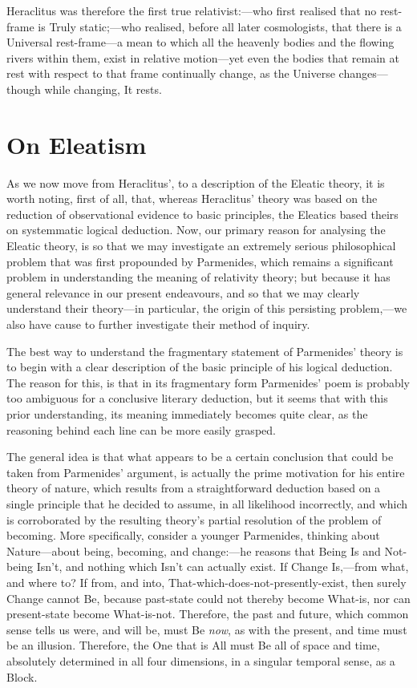 Heraclitus was therefore the first true relativist:---who first realised that no rest-frame is Truly static;---who realised, before all later cosmologists, that there is a Universal rest-frame---a mean to which all the heavenly bodies and the flowing rivers within them, exist in relative motion---yet even the bodies that remain at rest with respect to that frame continually change, as the Universe changes---though while changing, It rests. 
\section{On Eleatism\label{sec_OE}}
As we now move from Heraclitus', to a description of the Eleatic theory, it is worth noting, first of all, that, whereas Heraclitus' theory was based on the reduction of observational evidence to basic principles, the Eleatics based theirs on systemmatic logical deduction. Now, our primary reason for analysing the Eleatic theory, is so that we may investigate an extremely serious philosophical problem that was first propounded by Parmenides, which remains a significant problem in understanding the meaning of relativity theory; but because it has general relevance in our present endeavours, and so that we may clearly understand their theory---in particular, the origin of this persisting problem,---we also have cause to further investigate their method of inquiry. 

The best way to understand the fragmentary statement of Parmenides' theory is to begin with a clear description of the basic principle of his logical deduction. The reason for this, is that in its fragmentary form Parmenides' poem is probably too ambiguous for a conclusive literary deduction, but it seems that with this prior understanding, its meaning immediately becomes quite clear, as the reasoning behind each line can be more easily grasped.

The general idea is that what appears to be a certain conclusion that could be taken from Parmenides' argument, is actually the prime motivation for his entire theory of nature, which results from a straightforward deduction based on a single principle that he decided to assume, in all likelihood incorrectly, and which is corroborated by the resulting theory's partial resolution of the problem of becoming. More specifically, consider a younger Parmenides, thinking about Nature---about being, becoming, and change:---he reasons that Being Is and Not-being Isn't, and nothing which Isn't can actually exist. If Change Is,---from what, and where to? If from, and into, That-which-does-not-presently-exist, then surely Change cannot Be, because past-state could not thereby become What-is, nor can present-state become What-is-not. Therefore, the past and future, which common sense tells us were, and will be, must Be \textit{now}, as with the present, and time must be an illusion. Therefore, the One that is All must Be all of space and time, absolutely determined in all four dimensions, in a singular temporal sense, as a Block.

